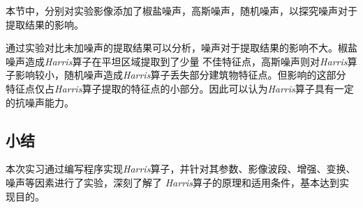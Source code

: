     本节中，分别对实验影像添加了椒盐噪声，高斯噪声，随机噪声，以探究噪声对于提取结果的影响。

    通过实验对比未加噪声的提取结果可以分析，噪声对于提取结果的影响不大。椒盐噪声造成\textit{Harris}算子在平坦区域提取到了少量
    不佳特征点，高斯噪声则对\textit{Harris}算子影响较小，随机噪声造成\textit{Harris}算子丢失部分建筑物特征点。但影响的这部分
    特征点仅占\textit{Harris}算子提取的特征点的小部分。因此可以认为\textit{Harris}算子具有一定的抗噪声能力。

\subsection{小结}
    本次实习通过编写程序实现\textit{Harris}算子，并针对其参数、影像波段、增强、变换、噪声等因素进行了实验，深刻了解了
    \textit{Harris}算子的原理和适用条件，基本达到实现目的。
